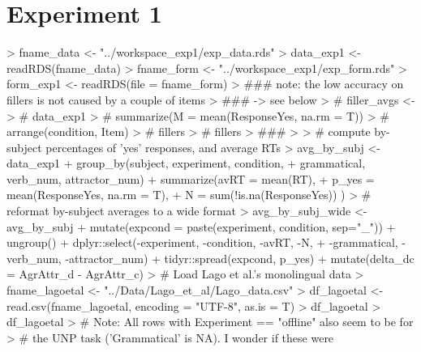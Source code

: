 \documentclass[doc,a4paper,man,natbib,floatsintext,noextraspace]{apa6}
\begin{document}


\section{Experiment 1} \label{sec:exp1}

\begin{Schunk}
\begin{Sinput}
> fname_data <- "../workspace_exp1/exp_data.rds"
> data_exp1 <- readRDS(fname_data)
> fname_form <- "../workspace_exp1/exp_form.rds"
> form_exp1 <- readRDS(file = fname_form)
> ### note: the low accuracy on fillers is not caused by a couple of items
> ###       -> see below
> # filler_avgs <- 
> # data_exp1 %>% subset(Type == "filler") %>% group_by(Item, condition) %>% 
> #               summarize(M = mean(ResponseYes, na.rm = T)) %>%
> #               arrange(condition, Item)
> # fillers %>% subset(condition == "a") 
> # fillers %>% subset(condition == "b")
> ###
> 
> # compute by-subject percentages of 'yes' responses, and average RTs 
> avg_by_subj <- data_exp1 %>%
+                 group_by(subject, experiment, condition, 
+                          grammatical, verb_num, attractor_num) %>%
+                 summarize(avRT = mean(RT), 
+                           p_yes = mean(ResponseYes, na.rm = T), 
+                           N = sum(!is.na(ResponseYes))  )
> # reformat by-subject averages to a wide format
> avg_by_subj_wide <- avg_by_subj %>% 
+                       mutate(expcond = paste(experiment, condition, sep="_")) %>% 
+                       ungroup() %>%
+                       dplyr::select(-experiment, -condition, -avRT, -N,
+                                     -grammatical, -verb_num, -attractor_num) %>%
+                       tidyr::spread(expcond, p_yes) %>% 
+                       mutate(delta_dc = AgrAttr_d - AgrAttr_c)
> # Load Lago et al.'s monolingual data
> fname_lagoetal <- "../Data/Lago_et_al/Lago_data.csv"
> df_lagoetal <- read.csv(fname_lagoetal, encoding = "UTF-8", as.is = T)
> df_lagoetal %<>% subset(Group == "monolingual")
> df_lagoetal %<>% dplyr::select(-Accuracy, -L1:-Group, -List:-SelfRateGerman)
> # Note: All rows with Experiment == "offline" also seem to be for 
> #       the UNP task ('Grammatical' is NA). I wonder if these were

\end{Sinput}
\end{Schunk}
\end{document}
